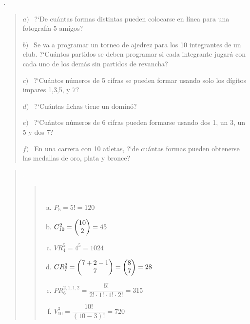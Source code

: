 \vspace{1cm} %
	

\vspace{1cm} %
	
\begin{ejemplo}
\begin{ejre}
	. 
\begin{quotation}		

	$a)\ \ $ ?`De cuántas formas distintas pueden colocarse en línea para una fotografía 5 amigos?
	
	$b)\ \ $ Se va a programar un torneo de ajedrez para los 10 integrantes de un club. ?`Cuántos partidos se deben programar si cada integrante jugará con cada uno de los demás sin partidos de revancha?
	
	$c)\ \ $ ?`Cuántos números de 5 cifras se pueden formar usando solo los dígitos impares 1,3,5, y 7?
	
	$d)\ \ $ ?`Cuántas fichas tiene un dominó?
	
	$e)\ \ $ ?`Cuántos números de 6 cifras pueden formarse usando dos 1, un 3, un 5 y dos 7?	
	
	$f)\ \ $ En una carrera con 10 atletas, ?`de cuántas formas pueden obtenerse las medallas de oro, plata y bronce?

\end{quotation}
\end{ejre}
\end{ejemplo}


\begin{quotation} \textcolor{white}{.}
\begin{quotation} \textcolor{white}{.}
\begin{enumerate}[a) $\to$ ]
	\item $P_5=5!=120$
	\item $C_{10}^2=\mqty(10\\2)=45$
	\item $VR_4^5=4^5=1024$	
	\item $CR_7^2=\mqty(7+2-1\\7)=\mqty(8\\7)=28$
	\item $PR_6^{2,1,1,2}=\dfrac{6!}{2!\cdot 1!\cdot 1!\cdot 2!}=315$
	\item $V_{10}^3=\dfrac{10!}{(10-3)!}=720$ 	
\end{enumerate}
\end{quotation}
\end{quotation}


